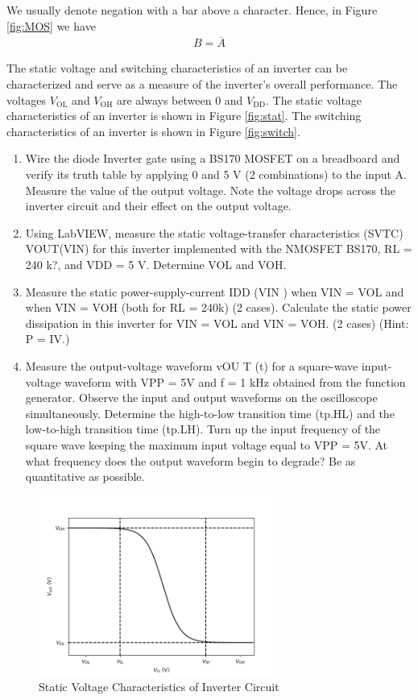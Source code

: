 \documentclass[12pt]{../manual}
\begin{document}
We usually denote negation with a bar above a character. Hence, in Figure \ref{fig:MOS} we have 
\begin{align}
B = \overline{A}
\end{align}

The static voltage and switching characteristics of an inverter can be characterized and serve as a measure of the inverter's overall performance. The voltages $V_\mathrm{OL}$ and $V_\mathrm{OH}$ are always between 0 and $V_\mathrm{DD}$. The static voltage characteristics of an inverter is shown in Figure \ref{fig:stat}. The switching characteristics of an inverter is shown in Figure \ref{fig:switch}.

\begin{enumerate}
\item Wire the diode Inverter gate using a BS170 MOSFET on a breadboard and verify its
truth table by applying 0 and 5 V (2 combinations) to the input A. Measure the value of
the output voltage. Note the voltage drops across the inverter circuit and their effect on
the output voltage.
\item Using LabVIEW, measure the static voltage-transfer characteristics (SVTC)
VOUT(VIN) for this inverter implemented with the NMOSFET BS170, RL = 240 k?,
and VDD = 5 V. Determine VOL and VOH.
\item Measure the static power-supply-current IDD (VIN ) when VIN = VOL and when VIN
= VOH (both for RL = 240k) (2 cases). Calculate the static power dissipation in this
inverter for VIN = VOL and VIN = VOH. (2 cases) (Hint: P = IV.)
\item Measure the output-voltage waveform vOU T (t) for a square-wave input-voltage
waveform with VPP = 5V and f = 1 kHz obtained from the function generator. Observe
the input and output waveforms on the oscilloscope simultaneously. Determine the
high-to-low transition time (tp.HL) and the low-to-high transition time (tp.LH). Turn up the
input frequency of the square wave keeping the maximum input voltage equal to VPP =
5V. At what frequency does the output waveform begin to degrade? Be as quantitative
as possible.
\end{enumerate}

\begin{figure}[ht!]
\centering
\includegraphics[width=0.7\textwidth]{staticCharInv.png}
\caption{Static Voltage Characteristics of Inverter Circuit}
\end{figure}
\end{document}
